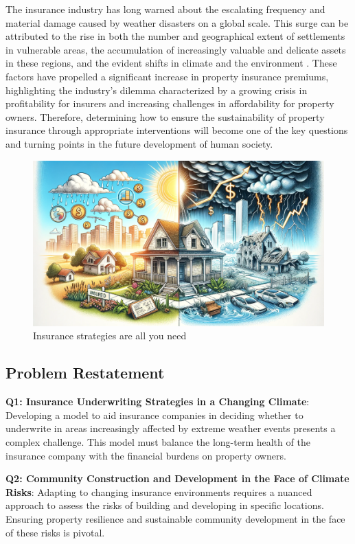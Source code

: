 \documentclass[12pt]{article}
\begin{document}
The insurance industry has long warned about the escalating frequency and material damage caused by weather disasters on a global scale. This surge can be attributed to the rise in both the number and geographical extent of settlements in vulnerable areas, the accumulation of increasingly valuable and delicate assets in these regions, and the evident shifts in climate and the environment \cite{kron2019changes}. These factors have propelled a significant increase in property insurance premiums, highlighting the industry's dilemma characterized by a growing crisis in profitability for insurers and increasing challenges in affordability for property owners. Therefore, determining how to ensure the sustainability of property insurance through appropriate interventions will become one of the key questions and turning points in the future development of human society.
\begin{figure}[h]
    \centering
    \includegraphics[width=0.8\linewidth]{figure/teasor2.png}
    \caption{Insurance strategies are all you need}
\end{figure}
\subsection{Problem Restatement}
\textbf{Q1: Insurance Underwriting Strategies in a Changing Climate}: Developing a model to aid insurance companies in deciding whether to underwrite in areas increasingly affected by extreme weather events presents a complex challenge. This model must balance the long-term health of the insurance company with the financial burdens on property owners.

\textbf{Q2: Community Construction and Development in the Face of Climate Risks}: Adapting to changing insurance environments requires a nuanced approach to assess the risks of building and developing in specific locations. Ensuring property resilience and sustainable community development in the face of these risks is pivotal.
\end{document}
